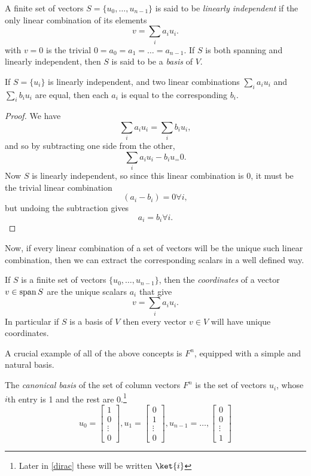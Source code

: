 \begin{define}
A finite set of vectors $S = \{u_0, \dots, u_{n-1}\}$ is said to be \emph{linearly independent} if the only linear combination of its elements
\[v = \sum_i a_i u_i.\]
with $v = 0$ is the trivial $0 = a_0 = a_1 = \dots = a_{n-1}$. If $S$ is both spanning and linearly independent, then $S$ is said to be a \emph{basis} of $V$.
\end{define}

\begin{prop}
	If $S = \{u_i\}$ is linearly independent, and two linear combinations $\sum_i a_iu_i$ and $\sum_i b_iu_i$ are equal, then each $a_i$ is equal to the corresponding $b_i$.
\end{prop}
\begin{proof}
	We have
	\[\sum_i a_iu_i = \sum_i b_iu_i,\]
	and so by subtracting one side from the other,
	\[\sum_i a_iu_i-b_iu_ = 0.\]
	Now $S$ is linearly independent, so since this linear combination is $0$, it must be the trivial linear combination
	\[(a_i - b_i) = 0 \forall i,\]
	but undoing the subtraction gives
	\[a_i = b_i \forall i.\]
\end{proof}

Now, if every linear combination of a set of vectors will be the unique such linear combination, then we can extract the corresponding scalars in a well defined way.

\begin{define}
If $S$ is a finite set of vectors $\{u_0, \dots, u_{n-1}\}$, then the \emph{coordinates} of a vector $v \in \operatorname{span} S$ are the unique scalars $a_i$ that give
\[v = \sum_i a_i u_i.\]
In particular if $S$ is a basis of $V$ then every vector $v \in V$ will have unique coordinates.
\end{define}

A crucial example of all of the above concepts is $F^n$, equipped with a simple and natural basis.
\begin{define}\label{canonical-basis}
	The \emph{canonical basis} of the set of column vectors $F^n$ is the set of vectors $u_i$, whose $i$th entry is 1 and the rest are 0.\footnote{Later in \autoref{dirac} these will be written $\ket{i}$}
	\[u_0 = \begin{bmatrix}
		1 \\ 0 \\ \vdots \\ 0
	\end{bmatrix}, u_1 = \begin{bmatrix}
		0 \\ 1 \\ \vdots \\ 0
	\end{bmatrix}, u_{n-1} = \dots, \begin{bmatrix}
		0 \\ 0 \\ \vdots \\ 1
	\end{bmatrix}\]
\end{define}


